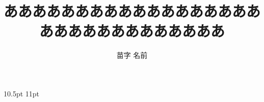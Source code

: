 \documentclass[a4paper,twocolumn,twoside,disablejfam,acnrathesis]{thesisresume}
\title{あああああああああああああああああああああああああああああああ}
\author{苗字 名前}
\begin{document}
\thesisresume
{
	\fontsize
	{10.5pt}	%
	{11pt}		%
	\selectfont
	
}

{\footnotesize}
\end{document}
